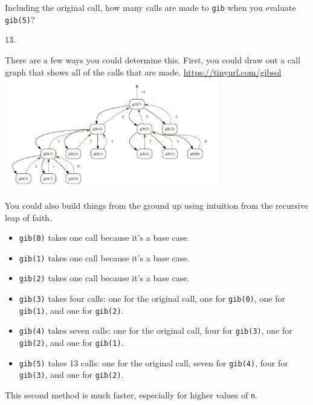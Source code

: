\begin{blocksection}
\question Including the original call, how many calls are made to \lstinline{gib} when you evaluate \lstinline{gib(5)}?

\begin{solution}[2in]
13. 

There are a few ways you could determine this. First, you could draw out a call graph that shows all of the calls that are made. 
\url{https://tinyurl.com/gibsol}
\includegraphics[width=0.7\textwidth]{gibonacci.png}

You could also build things from the ground up using intuition from the recursive leap of faith. 
\begin{itemize}
    \item \lstinline{gib(0)} takes one call because it's a base case. 
    \item \lstinline{gib(1)} takes one call because it's a base case. 
    \item \lstinline{gib(2)} takes one call because it's a base case. 
    \item \lstinline{gib(3)} takes four calls: one for the original call, one for \lstinline{gib(0)}, one for \lstinline{gib(1)}, and one for \lstinline{gib(2)}. 
    \item \lstinline{gib(4)} takes seven calls: one for the original call, four for \lstinline{gib(3)}, one for \lstinline{gib(2)}, and one for \lstinline{gib(1)}. 
    \item \lstinline{gib(5)} takes 13 calls: one for the original call, seven for \lstinline{gib(4)}, four for \lstinline{gib(3)}, and one for \lstinline{gib(2)}. 
\end{itemize}
This second method is much faster, especially for higher values of \lstinline{n}. 
\end{solution}
\end{blocksection}

